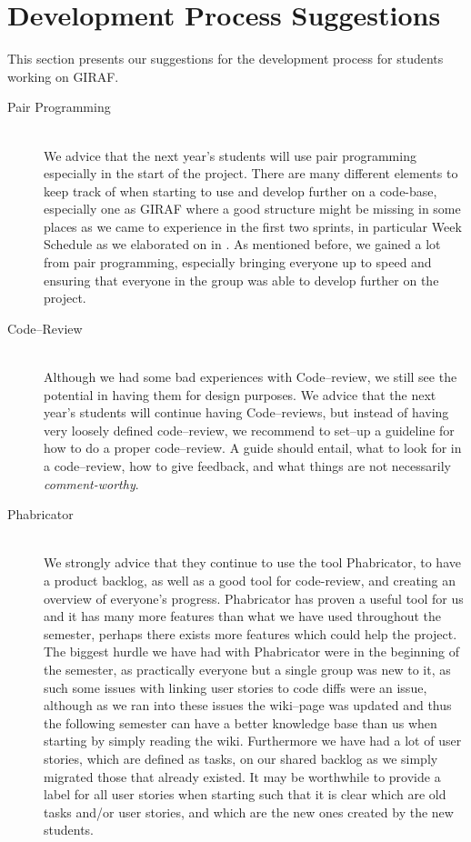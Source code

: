 \section{Development Process Suggestions}
This section presents our suggestions for the development process for students working on GIRAF.

\begin{description}
	\item[Pair Programming] \hfill \\
	We advice that the next year's students will use pair programming especially in the start of the project.
	There are many different elements to keep track of when starting to use and develop further on a code-base, especially one as GIRAF where a good structure might be missing in some places as we came to experience in the first two sprints, in particular Week Schedule as we elaborated on in .
	As mentioned before, we gained a lot from pair programming, especially bringing everyone up to speed and ensuring that everyone in the group was able to develop further on the project.

	\item[Code--Review] \hfill \\
	Although we had some bad experiences with Code--review, we still see the potential in having them for design purposes.
	We advice that the next year's students will continue having Code--reviews, but instead of having very loosely defined code--review, we recommend to set--up a guideline for how to do a proper code--review.
	A guide should entail, what to look for in a code--review, how to give feedback, and what things are not necessarily \textit{comment-worthy}.

	\item[Phabricator] \hfill \\
	We strongly advice that they continue to use the tool Phabricator, to have a product backlog, as well as a good tool for code-review, and creating an overview of everyone's progress.
	Phabricator has proven a useful tool for us and it has many more features than what we have used throughout the semester, perhaps there exists more features which could help the project.
	The biggest hurdle we have had with Phabricator were in the beginning of the semester, as practically everyone but a single group was new to it, as such some issues with linking user stories to code diffs were an issue, although as we ran into these issues the wiki--page was updated and thus the following semester can have a better knowledge base than us when starting by simply reading the wiki.
	Furthermore we have had a lot of user stories, which are defined as tasks, on our shared backlog as we simply migrated those that already existed.
	It may be worthwhile to provide a label for all user stories when starting such that it is clear which are old tasks and/or user stories, and which are the new ones created by the new students.


\end{description}
